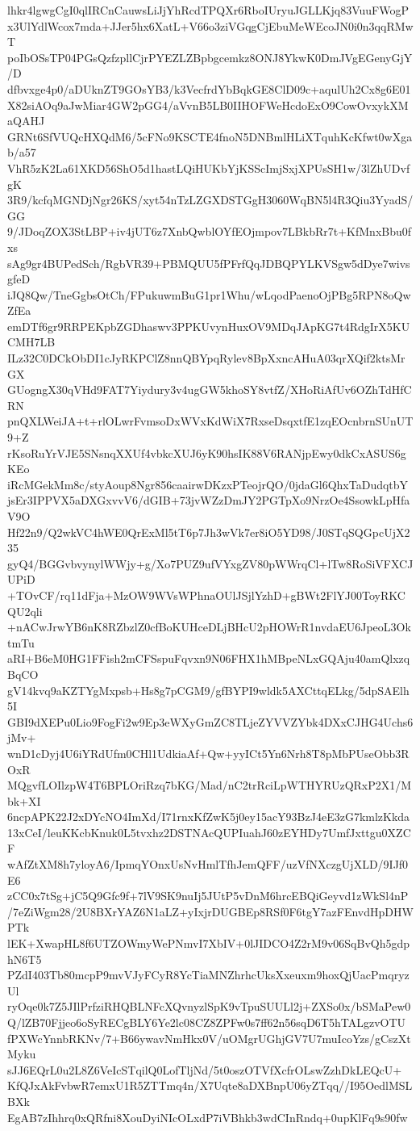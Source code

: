 lhkr4lgwgCgI0qlIRCnCauwsLiJjYhRcdTPQXr6RboIUryuJGLLKjq83VuuFWogP
x3UlYdlWcox7mda+JJer5hx6XatL+V66o3ziVGqgCjEbuMeWEcoJN0i0n3qqRMwT
poIbOSsTP04PGsQzfzpllCjrPYEZLZBpbgcemkz8ONJ8YkwK0DmJVgEGenyGjY/D
dfbvxge4p0/aDUknZT9GOsYB3/k3VecfrdYbBqkGE8ClD09c+aqulUh2Cx8g6E01
X82siAOq9aJwMiar4GW2pGG4/aVvnB5LB0IIHOFWeHcdoExO9CowOvxykXMaQAHJ
GRNt6SfVUQcHXQdM6/5cFNo9KSCTE4fnoN5DNBmlHLiXTquhKcKfwt0wXgab/a57
VhR5zK2La61XKD56ShO5d1hastLQiHUKbYjKSScImjSxjXPUsSH1w/3lZhUDvfgK
3R9/kcfqMGNDjNgr26KS/xyt54nTzLZGXDSTGgH3060WqBN5l4R3Qiu3YyadS/GG
9/JDoqZOX3StLBP+iv4jUT6z7XnbQwblOYfEOjmpov7LBkbRr7t+KfMnxBbu0fxs
sAg9gr4BUPedSch/RgbVR39+PBMQUU5fPFrfQqJDBQPYLKVSgw5dDye7wivsgfeD
iJQ8Qw/TneGgbsOtCh/FPukuwmBuG1pr1Whu/wLqodPaenoOjPBg5RPN8oQwZfEa
emDTf6gr9RRPEKpbZGDhaswv3PPKUvynHuxOV9MDqJApKG7t4RdgIrX5KUCMH7LB
ILz32C0DCkObDI1cJyRKPClZ8nnQBYpqRylev8BpXxncAHuA03qrXQif2ktsMrGX
GUogngX30qVHd9FAT7Yiydury3v4ugGW5khoSY8vtfZ/XHoRiAfUv6OZhTdHfCRN
pnQXLWeiJA+t+rlOLwrFvmsoDxWVxKdWiX7RxseDsqxtfE1zqEOcnbrnSUnUT9+Z
rKsoRuYrVJE5SNsnqXXUf4vbkcXUJ6yK90hsIK88V6RANjpEwy0dkCxASUS6gKEo
iRcMGekMm8c/styAoup8Ngr856caairwDKzxPTeojrQO/0jdaGl6QhxTaDudqtbY
jsEr3IPPVX5aDXGxvvV6/dGIB+73jvWZzDmJY2PGTpXo9NrzOe4SsowkLpHfaV9O
Hf22n9/Q2wkVC4hWE0QrExMl5tT6p7Jh3wVk7er8iO5YD98/J0STqSQGpcUjX235
gyQ4/BGGvbvynylWWjy+g/Xo7PUZ9ufVYxgZV80pWWrqCl+lTw8RoSiVFXCJUPiD
+TOvCF/rq11dFja+MzOW9WVsWPhnaOUlJSjlYzhD+gBWt2FlYJ00ToyRKCQU2qli
+nACwJrwYB6nK8RZbzlZ0cfBoKUHceDLjBHcU2pHOWrR1nvdaEU6JpeoL3OktmTu
aRI+B6eM0HG1FFish2mCFSspuFqvxn9N06FHX1hMBpeNLxGQAju40amQlxzqBqCO
gV14kvq9aKZTYgMxpsb+Hs8g7pCGM9/gfBYPI9wldk5AXCttqELkg/5dpSAElh5I
GBI9dXEPu0Lio9FogFi2w9Ep3eWXyGmZC8TLjeZYVVZYbk4DXxCJHG4Uchs6jMv+
wnD1cDyj4U6iYRdUfm0CHl1UdkiaAf+Qw+yyICt5Yn6Nrh8T8pMbPUseObb3ROxR
MQgvfLOIlzpW4T6BPLOriRzq7bKG/Mad/nC2trRciLpWTHYRUzQRxP2X1/Mbk+XI
6ncpAPK22J2xDYcNO4ImXd/I71rnxKfZwK5j0ey15acY93BzJ4eE3zG7kmlzKkda
13xCeI/leuKKcbKnuk0L5tvxhz2DSTNAcQUPIuahJ60zEYHDy7UmfJxttgu0XZCF
wAfZtXM8h7yloyA6/IpmqYOnxUsNvHmlTfhJemQFF/uzVfNXczgUjXLD/9IJf0E6
zCC0x7tSg+jC5Q9Gfc9f+7lV9SK9nuIj5JUtP5vDnM6hrcEBQiGeyvd1zWkSl4nP
/7eZiWgm28/2U8BXrYAZ6N1aLZ+yIxjrDUGBEp8RSf0F6tgY7azFEnvdHpDHWPTk
lEK+XwapHL8f6UTZOWmyWePNmvI7XbIV+0lJIDCO4Z2rM9v06SqBvQh5gdphN6T5
PZdI403Tb80mcpP9mvVJyFCyR8YcTiaMNZhrhcUksXxeuxm9hoxQjUacPmqryzUl
ryOqe0k7Z5JIlPrfziRHQBLNFcXQvnyzlSpK9vTpuSUULl2j+ZXSo0x/bSMaPew0
Q/lZB70Fjjeo6oSyRECgBLY6Ye2lc08CZ8ZPFw0s7ff62n56sqD6T5hTALgzvOTU
fPXWcYnnbRKNv/7+B66ywavNmHkx0V/uOMgrUGhjGV7U7muIcoYzs/gCszXtMyku
sJJ6EQrL0u2L8Z6VeIcSTqilQ0LofTljNd/5t0oszOTVfXcfrOLswZzhDkLEQcU+
KfQJxAkFvbwR7emxU1R5ZTTmq4n/X7Uqte8aDXBnpU06yZTqq//I95OedlMSLBXk
EgAB7zIhhrq0xQRfni8XouDyiNIcOLxdP7iVBhkb3wdCInRndq+0upKlFq9s90fw
